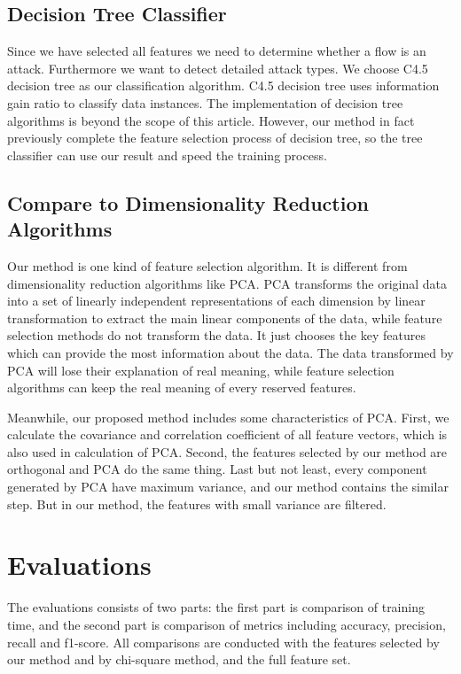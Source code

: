 \documentclass[journal]{IEEEtran}
\begin{document}
\subsection{Decision Tree Classifier}

Since we have selected all features we need to determine whether a flow is an attack. Furthermore we want to detect detailed attack types. We choose C4.5 decision tree\cite{quinlan2014c4} as our classification algorithm. C4.5 decision tree uses information gain ratio to classify data instances. The implementation of decision tree algorithms is beyond the scope of this article. However, our method in fact previously complete the feature selection process of decision tree, so the tree classifier can use our result and speed the training process.

\subsection{Compare to Dimensionality Reduction Algorithms}

Our method is one kind of feature selection algorithm. It is different from dimensionality reduction algorithms like PCA\cite{PCA1987}. PCA transforms the original data into a set of linearly independent representations of each dimension by linear transformation to extract the main linear components of the data, while feature selection methods do not transform the data. It just chooses the key features which can provide the most information about the data. The data transformed by PCA will lose their explanation of real meaning, while feature selection algorithms can keep the real meaning of every reserved features. 

Meanwhile, our proposed method includes some characteristics of PCA. First, we calculate the covariance and correlation coefficient of all feature vectors, which is also used in calculation of PCA. Second, the features selected by our method are orthogonal and PCA do the same thing. Last but not least, every component generated by PCA have maximum variance, and our method contains the similar step. But in our method, the features with small variance are filtered.

\section{Evaluations}
\label{sec:evaluation}

The evaluations consists of two parts: the first part is comparison of training time, and the second part is comparison of metrics including accuracy, precision, recall and f1-score. All comparisons are conducted with the features selected by our method and by chi-square method, and the full feature set.
\end{document}

